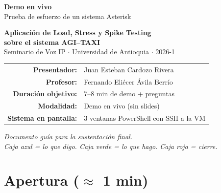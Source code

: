 \documentclass[11pt,letterpaper]{article}
\begin{document}
\thispagestyle{empty}
\vspace*{2cm}
\begin{center}
{\Huge\bfseries Demo en vivo}\\[0.6em]
{\Large\color{negro!70} Prueba de esfuerzo de un sistema Asterisk}\\[1.5em]

\begin{tcolorbox}[colback=verde!10, colframe=verde, boxrule=0.8pt, arc=2mm, width=0.85\textwidth]
\centering
{\Large\bfseries Aplicaci\'on de Load, Stress y Spike Testing}\\[0.3em]
{\Large\bfseries sobre el sistema AGI--TAXI}\\[0.5em]
{\normalsize Seminario de Voz IP $\cdot$ Universidad de Antioquia $\cdot$ 2026-1}
\end{tcolorbox}

\vspace{2em}

\begin{tabular}{rl}
\textbf{Presentador:} & Juan Esteban Cardozo Rivera \\
\textbf{Profesor:} & Fernando Eli\'ecer \'Avila Berr\'io \\[0.5em]
\textbf{Duraci\'on objetivo:} & 7--8 min de demo + preguntas \\
\textbf{Modalidad:} & Demo en vivo (sin slides) \\
\textbf{Sistema en pantalla:} & 3 ventanas PowerShell con SSH a la VM \\
\end{tabular}

\vfill

{\small\itshape Documento gu\'ia para la sustentaci\'on final.\\
Caja azul = lo que digo. Caja verde = lo que hago. Caja roja = cierre.}
\end{center}

\newpage

\section*{Apertura ($\approx$ 1 min)}
\end{document}
